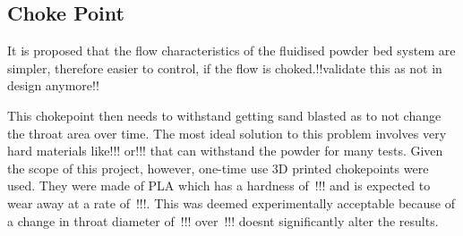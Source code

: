 \subsection{Choke Point}
It is proposed that the flow characteristics of the fluidised powder bed system are simpler, therefore easier to control, if the flow is choked.!!validate this as not in design anymore!!


This chokepoint then needs to withstand getting sand blasted as to not change the throat area over time. The most ideal solution to this problem involves very hard materials like!!! or!!! that can withstand the powder for many tests. Given the scope of this project, however, one-time use 3D printed chokepoints were used. They were made of PLA which has a hardness of~!!! and is expected to wear away at a rate of~!!!. This was deemed experimentally acceptable because of a change in throat diameter of~!!! over~!!! doesnt significantly alter the results.
